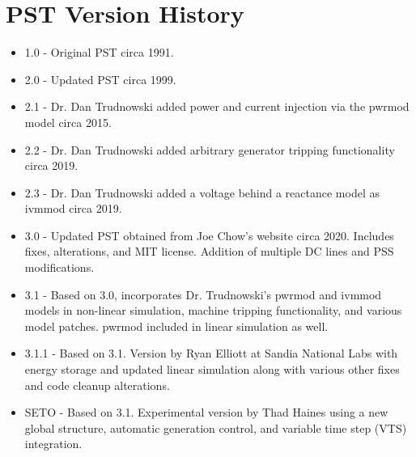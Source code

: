 \chapter{PST Version History}



\begin{itemize}
\raggedright
{} em
\singlespacing
\item 1.0 - Original PST circa 1991.
\item 2.0 - Updated PST circa 1999.
\item 2.1 - Dr. Dan Trudnowski added power and current injection via the pwrmod model circa 2015.
\item 2.2 - Dr. Dan Trudnowski added arbitrary generator tripping functionality circa 2019.
\item 2.3 - Dr. Dan Trudnowski added a voltage behind a reactance model as ivmmod circa 2019.
\item 3.0 - Updated PST obtained from Joe Chow's website circa 2020. 
Includes fixes, alterations, and MIT license.
Addition of multiple DC lines and PSS modifications.
\item 3.1 - Based on 3.0, incorporates Dr. Trudnowski's pwrmod and ivmmod models in non-linear simulation, machine tripping functionality, and various model patches.
pwrmod included in linear simulation as well. 
\item 3.1.1 - Based on 3.1. Version by Ryan Elliott at Sandia National Labs with energy storage and updated linear simulation along with various other fixes and code cleanup alterations. 
\item SETO - Based on 3.1. Experimental version by Thad Haines using a new global structure, automatic generation control, and variable time step (VTS) integration. 


\end{itemize}
